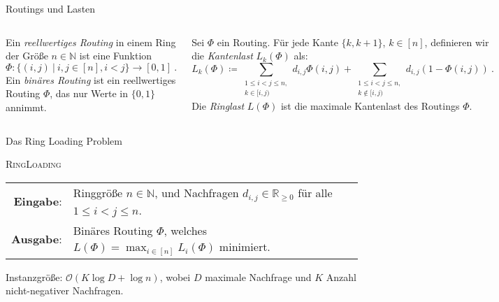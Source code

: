 \documentclass[8pt]{beamer}
\newcommand{\R}{\mathbb{R}}
\newcommand{\cO}{\mathcal{O}}
\newcommand{\N}{\mathbb{N}}
\theoremstyle{claim}
\begin{document}
	\begin{frame}{Routings und Lasten}
		\begin{columns}
			\begin{definition}[Routing]
			\label{def:routing}
			Ein \emph{reellwertiges Routing} in einem Ring der Größe $n \in \N$ ist eine Funktion
			\begin{equation}
				\Phi: \{(i, j)\ |\ i, j \in [n], i < j \} \rightarrow [0, 1] \ .
				\end{equation}
				Ein \emph{binäres Routing} ist ein reellwertiges Routing $\Phi$, das nur Werte in $\{0, 1\}$ annimmt. 
			\end{definition}\pause		
			\begin{definition}
				\label{def:edge-load}
				Sei $\Phi$ ein Routing.
				Für jede Kante $\{k, k+1\}$, $k \in [n]$, definieren wir die \emph{Kantenlast} $L_k(\Phi)$ als:
				\begin{equation}
					\label{eq:edge-load}
					L_k(\Phi) \coloneqq \sum_{\substack{1 \leq i < j \leq n,\\ k \in [i, j)}} d_{i, j} \Phi(i, j) + \sum_{\substack{1 \leq i < j \leq n,\\ k \notin [i, j)}} d_{i, j} (1 - \Phi(i, j)) \ .
				\end{equation}
				Die \emph{Ringlast} $L(\Phi)$ ist die maximale Kantenlast des Routings $\Phi$.
			\end{definition}
			
		\end{columns} 
	\end{frame}

	\begin{frame}{Das Ring Loading Problem}
		\begin{center}
			\begin{mdframed}
				\centering
				\textsc{RingLoading}\\[0.7em]
				\begin{tabularx}{\textwidth}{rl}
					{\bfseries Eingabe}: & Ringgröße $n \in \N$, und Nachfragen $d_{i, j} \in \R_{\geq 0}$ für alle $1 \leq i<j\leq n$.\\
					{\bfseries Ausgabe}: & Binäres Routing $\Phi$, welches $L(\Phi) = \max_{i \in [n]} L_i(\Phi)$ minimiert.
				\end{tabularx}
			\end{mdframed}
		\end{center}\pause
		Instanzgröße: $\cO(K \log D + \log n)$, wobei $D$ maximale Nachfrage und $K$ Anzahl nicht-negativer Nachfragen.
	\end{frame}
\end{document}
